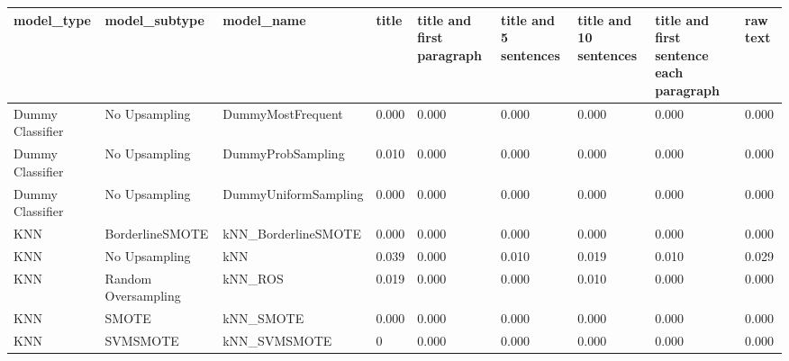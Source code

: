 \begin{tabular}{lllllllll}
\toprule
                  model\_type &       model\_subtype &                                   model\_name & title & title and first paragraph & title and 5 sentences & title and 10 sentences & title and first sentence each paragraph & raw text \\
\midrule
            Dummy Classifier &       No Upsampling &                            DummyMostFrequent & 0.000 &                     0.000 &                 0.000 &                  0.000 &                                   0.000 &    0.000 \\
            Dummy Classifier &       No Upsampling &                            DummyProbSampling & 0.010 &                     0.000 &                 0.000 &                  0.000 &                                   0.000 &    0.000 \\
            Dummy Classifier &       No Upsampling &                         DummyUniformSampling & 0.000 &                     0.000 &                 0.000 &                  0.000 &                                   0.000 &    0.000 \\
                         KNN &     BorderlineSMOTE &                          kNN\_BorderlineSMOTE & 0.000 &                     0.000 &                 0.000 &                  0.000 &                                   0.000 &    0.000 \\
                         KNN &       No Upsampling &                                          kNN & 0.039 &                     0.000 &                 0.010 &                  0.019 &                                   0.010 &    0.029 \\
                         KNN & Random Oversampling &                                      kNN\_ROS & 0.019 &                     0.000 &                 0.000 &                  0.010 &                                   0.000 &    0.000 \\
                         KNN &               SMOTE &                                    kNN\_SMOTE & 0.000 &                     0.000 &                 0.000 &                  0.000 &                                   0.000 &    0.000 \\
                         KNN &            SVMSMOTE &                                 kNN\_SVMSMOTE &     0 &                     0.000 &                 0.000 &                  0.000 &                                   0.000 &    0.000 \\

\end{tabular}
